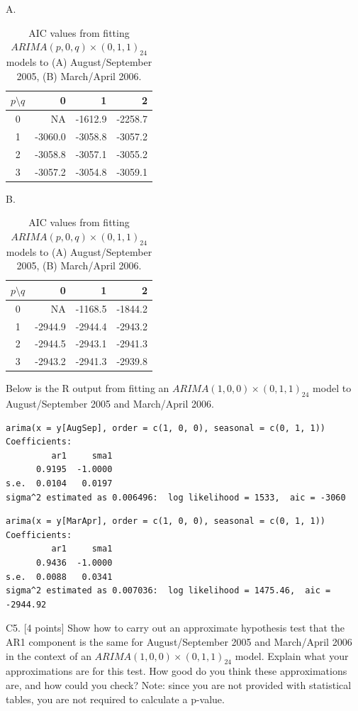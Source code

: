 \documentclass[12pt]{article}
\def\qskip{\vspace{1.5in}}
\begin{document}
\qskip
\qskip

\begin{table}[ht]
A.\begin{tabular}{c|rrr}
$p\setminus q$ &     0 &    1 &    2 \\
\hline
 0&     NA &-1612.9 &-2258.7\\
 1&-3060.0 &-3058.8 &-3057.2\\
 2&-3058.8 &-3057.1 &-3055.2\\
3&-3057.2 &-3054.8 &-3059.1
\end{tabular}
\hspace{0.5in} 
B. \begin{tabular}{c|rrr}
 $p\setminus q$ &     0 &    1 &    2 \\
\hline
 0&     NA &-1168.5 &-1844.2\\
 1&-2944.9 &-2944.4 &-2943.2\\
 2&-2944.5 &-2943.1 &-2941.3\\
3 &-2943.2 &-2941.3 &-2939.8
\end{tabular}
\caption{AIC values from fitting $ARIMA(p,0,q){\times}(0,1,1)_{24}$ models to (A) August/September 2005, (B) March/April 2006.}\label{tab:aic}
\end{table}   

\newpage
Below is the R output from fitting an $ARIMA(1,0,0){\times}(0,1,1)_{24}$ model to August/September 2005 and March/April 2006.
\begin{verbatim}
arima(x = y[AugSep], order = c(1, 0, 0), seasonal = c(0, 1, 1))
Coefficients:
         ar1     sma1
      0.9195  -1.0000
s.e.  0.0104   0.0197
sigma^2 estimated as 0.006496:  log likelihood = 1533,  aic = -3060
\end{verbatim}
\begin{verbatim}
arima(x = y[MarApr], order = c(1, 0, 0), seasonal = c(0, 1, 1))
Coefficients:
         ar1     sma1
      0.9436  -1.0000
s.e.  0.0088   0.0341
sigma^2 estimated as 0.007036:  log likelihood = 1475.46,  aic = -2944.92
\end{verbatim}


C5. [4 points] Show how to carry out an approximate hypothesis test that the AR1 component is the same for August/September 2005 and March/April 2006 in the context of an
 $ARIMA(1,0,0){\times}(0,1,1)_{24}$ model. 
Explain what your approximations are for this test. How good do you think these approximations are, and how could you check?
Note: since you are not provided with statistical tables, you are not required to calculate a p-value.


\qskip

\qskip
\end{document}
